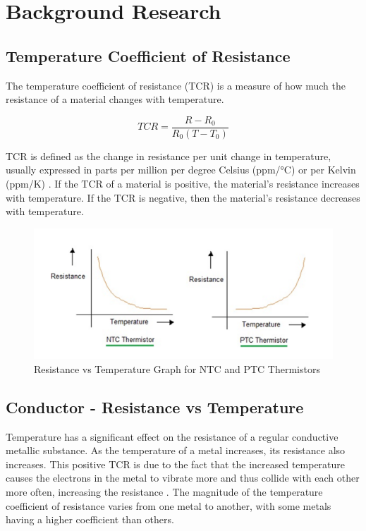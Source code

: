\section{Background Research}
\subsection{Temperature Coefficient of Resistance}
The temperature coefficient of resistance (TCR) is a measure of how much the resistance of a material changes with temperature. 

\[TCR = \frac{R-R_0}{R_0(T-T_0)}\]

TCR is defined as the change in resistance per unit change in temperature, usually expressed in parts per million per degree Celsius (ppm/°C) or per Kelvin (ppm/K) \citep{feteira2009negative}.  If the TCR of a material is positive, the material's resistance increases with temperature. If the TCR is negative, then the material's resistance decreases with temperature.

\begin{figure}[H]
    \centering
    \includegraphics[width=130mm,height=\textheight,keepaspectratio]{images/ntc_ptc.png}
    \caption{Resistance vs Temperature Graph for NTC and PTC Thermistors \citep{amethermptcntc}}
    \label{fig:ntc_ptc}
\end{figure}

\subsection{Conductor - Resistance vs Temperature}
Temperature has a significant effect on the resistance of a regular conductive metallic substance. As the temperature of a metal increases, its resistance also increases. This positive TCR is due to the fact that the increased temperature causes the electrons in the metal to vibrate more and thus collide with each other more often, increasing the resistance \citep{butera1997dependence}. The magnitude of the temperature coefficient of resistance varies from one metal to another, with some metals having a higher coefficient than others.


